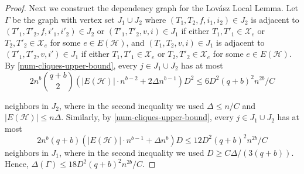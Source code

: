 \documentclass[11pt]{article}
\numberwithin{equation}{section}
\newcounter{i}
\theoremstyle{plain}
\theoremstyle{plain} %
\theoremstyle{definition}
\newcommand{\cH}{\mathcal{H}}
\newcommand{\cX}{\mathcal{X}}
\def\COMMENT#1{}
\begin{document}
\begin{proof}
    Next we construct the dependency graph for the Lov\'asz Local Lemma.  Let $\Gamma$ be the graph with vertex set $J_1 \cup J_2$ where $(T_1, T_2, f,i_1,i_2) \in J_2$ is adjacent to $(T'_1, T'_2, f,i'_1,i'_2) \in J_2$ or $(T'_1, T'_2, v, i) \in J_1$ if either $T_1, T'_1 \in \cX_e$ or $T_2, T'_2 \in \cX_e$ for some $e \in E(\cH)$, and $(T_1, T_2, v, i) \in J_1$ is adjacent to $(T'_1, T'_2, v, i') \in J_1$ if either $T_1, T'_1 \in \cX_e$ or $T_2, T'_2 \in \cX_e$ for some $e \in E(\cH)$.  
    By \ref{num-cliques-upper-bound}, every $j \in J_1 \cup J_2$ has at most 
    \begin{equation*}
        2n^b\binom{q + b}{2}\left(|E(\cH)| \cdot n^{b - 2} + 2\Delta n^{b - 1}\right)D^2 \leq 6D^2 (q + b)^2 n^{2b} / C
    \end{equation*}
    \COMMENT{We have $2$ choices for whether we'll have $T_1, T'_1 \in \cX_{e_1}$ or $T_2, T'_2 \in \cX_{e_2}$, assume wlog the former, then $n^b$ choices for $T'_1 \in \cX_e$, then $\binom{q + b}{2}$ choices for which edge of $T'_1$ plays the role of $f$, and then two types of choices for $T'_2 \in \cX_{e'_2}$ depending on whether $f$ is rooted at $V(e'_2)$ or not.  If it is not rooted at $V(e'_2)$, then we have $|E(\cH)|$ choices for $e'_2$ and at most $n^{b-2}$ choices for $T'_2 \in \cX_{e'_2}$ containing $f$ by \ref{num-cliques-upper-bound}.  If it is rooted at $V(e'_2)$, then there are two choices for the end of $f$, $\Delta_1(\cH)$ choices for $e'_2 \in \cH$ containing that vertex, and $n^{b-1}$ choices for $T'_2 \in \cX_{e'_2}$ containing the other end of $f$ by \ref{num-cliques-upper-bound}.}
    neighbors in $J_2$, where in the second inequality we used $\Delta \leq n / C$ and $|E(\cH)| \leq n\Delta$.  Similarly, by \ref{num-cliques-upper-bound}, every $j \in J_1 \cup J_2$ has at most 
    \begin{equation*}
        2n^b(q + b)\left(|E(\cH)|\cdot n^{b - 1} + \Delta n^b\right)D \leq 12D^2 (q + b)^2n^{2b} / C
    \end{equation*}
    neighbors in $J_1$, where in the second inequality we used $D \geq C\Delta / (3(q + b))$.  Hence, $\Delta(\Gamma) \leq 18D^2(q + b)^2n^{2b} / C$.


\end{proof}
\end{document}
